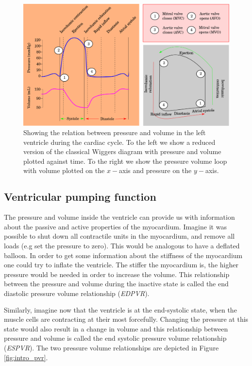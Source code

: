\begin{figure}[htbp]
  \centering
    \includegraphics{chapters/introduction/figures/cardiac_cycle}
\caption{Showing the relation between pressure and volume in the left
  ventricle during the cardiac cycle. To the left we show a reduced version of
the classical Wiggers diagram with pressure and volume plotted against
time. To the right we show the pressure volume loop
with volume plotted on the $x-$axis and pressure on the $y-$axis. }
\label{fig:pv_loop}
\end{figure}


\subsection{Ventricular pumping function}
\label{sec:ventricular_pumping_function}



The pressure and volume inside the ventricle can provide us with
information about the passive and active properties of the
myocardium. Imagine it was possible to shut down all contractile
units in the myocardium, and remove all loads (e.g set the pressure
to zero). This would be analogous to have a deflated balloon. In order to
get some information about the stiffness of the myocardium one could
try to inflate the ventricle. The stiffer the myocardium is, the
higher pressure would be needed in order to increase the volume.
This relationship between the pressure and volume during the inactive
state is called the end diastolic pressure volume relationship
(\emph{EDPVR}).

Similarly, imagine now that the ventricle is at the end-systolic state,
when the muscle cells are contracting at their most forcefully. Changing
the pressure at this state would also result in a change in volume and
this relationship between pressure and volume  is called the end
systolic pressure volume relationship (\emph{ESPVR}). The two pressure
volume relationships are depicted in Figure \ref{fig:intro_pvr}.

